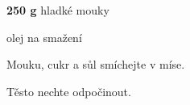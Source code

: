 

\begin{ingredience}
  \item \textbf{250 g} hladké mouky
  \item olej na smažení
\end{ingredience}

\begin{postup}
  \item Mouku, cukr a sůl smíchejte v míse.
  \item Těsto nechte odpočinout.
\end{postup}


